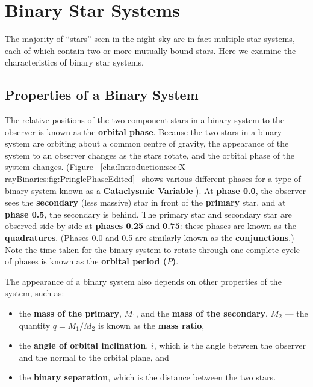 
\section{Binary Star Systems}\label{cha:Introduction:sec:BinaryStarSystems}

The majority of ``stars'' seen in the night sky are in fact multiple-star systems, each of which contain two or more mutually-bound stars. Here we examine the characteristics of binary star systems.


\subsection{Properties of a Binary System}\label{cha:Introduction:sec:BinaryStarSystems:subsec:Properties}

The relative positions of the two component
stars in a binary system to the observer is known as the
\textbf{orbital phase}. Because the two stars in a binary system are orbiting about a common
centre of gravity, the appearance of the system to an observer changes as the stars rotate, and the orbital phase of the system changes. (Figure~%
\vref{cha:Introduction:sec:X-rayBinaries:fig:PringlePhaseEdited}%
\ shows various different phases for a type of binary system known as a
\textbf{Cataclysmic Variable}%
). At \textbf{phase 0.0}, the observer sees the \textbf{secondary}
(less massive) star in front of the \textbf{primary} star, and at
\textbf{phase 0.5}, the secondary is behind. The primary star and secondary star are observed side by
side at \textbf{phases 0.25} and \textbf{0.75}: these phases are known
as the \textbf{quadratures}. (Phases 0.0 and 0.5 are similarly known
as the \textbf{conjunctions}.) Note the time taken for the binary
system to rotate through one complete cycle of phases is known as the \textbf{orbital period ($P$)}. %

\vspace{\myparskip}

The appearance of a binary system also depends on other properties of
the system, such as:
\begin{itemize}
\item
the \textbf{mass of the primary}, $M_1$, and the \textbf{mass of the secondary}, $M_2$ --- the quantity $q = M_{1}/M_{2}$ is known as the \textbf{mass ratio}, %
\item
the \textbf{angle of orbital inclination}, $i$, which is the angle
between the observer and the normal to the orbital plane, and %
\item
the \textbf{binary separation}, which is the distance between the two stars. %
\end{itemize}

